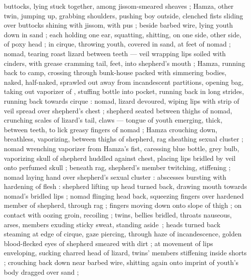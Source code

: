 buttocks, lying stuck together, among jissom-smeared sheaves ; Hamza, other twin, jumping up, grabbing shoulders, pushing boy outside, clenched fists sliding over buttocks shining with jissom, with pus ; beside barbed wire, lying youth down in sand ; each holding one ear, squatting, shitting, on one side, other side, of poxy head ; in cirque, throwing youth, covered in sand, at feet of nomad ; nomad, tearing roast lizard between teeth --- veil wrapping lips soiled with cinders, with grease {\dashcom} cramming tail, feet, into shepherd's mouth ; Hamza, running back to camp, crossing through bunk-house packed with simmering bodies, naked, half-naked, sprawled out away from incandescent partitions, opening bag, taking out vaporizer of , stuffing bottle into pocket, running back in long strides, running back towards cirque : nomad, lizard devoured, wiping lips with strip of veil spread over shepherd's chest ; shepherd seated between thighs of nomad, crunching scales of lizard's tail, claws --- tongue of youth emerging, thick, between teeth, to lick greasy fingers of nomad ; Hamza crouching down, breathless, vaporizing, between thighs of shepherd, rag sheathing sexual cluster ; nomad wrenching vaporizer from Hamza's fist, caressing blue bottle, grey bulb, vaporizing skull of shepherd huddled against chest, placing lips bridled by veil onto perfumed skull ; beneath rag, shepherd's member twitching, stiffening ; nomad laying hand over shepherd's sexual cluster : abscesses bursting with hardening of flesh : shepherd lifting up head turned back, drawing mouth towards nomad's bridled lips ; nomad flinging head back, squeezing fingers over hardened member of shepherd, through rag ; fingers moving down onto slope of thigh ; on contact with oozing groin, recoiling ; twins, bellies bridled, throats nauseous, arses, members exuding sticky sweat, standing aside~; heads turned back steaming at edge of cirque, gaze piercing, through haze of incandescence, golden blood-flecked eyes of shepherd smeared with dirt ; at movement of lips enveloping, sucking charred head of lizard, twins' members stiffening inside shorts ; crouching back down near barbed wire, shitting again onto imprint of youth's body dragged over sand ;
